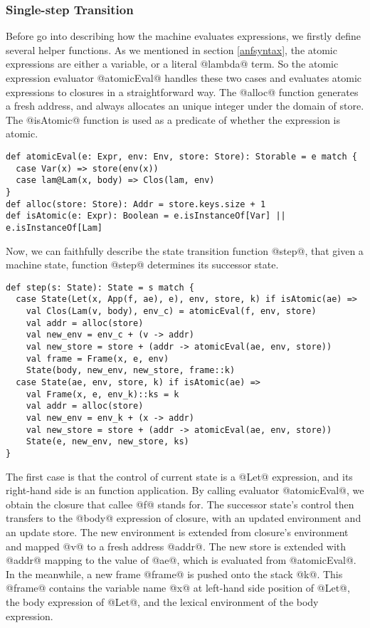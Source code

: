 \documentclass[acmsmall,review,anonymous]{acmart}\settopmatter{printfolios=true,printccs=false,printacmref=false}
\begin{document}
\subsubsection{Single-step Transition}
Before go into describing how the machine evaluates expressions, we firstly define several helper functions.
As we mentioned in section \ref{anfsyntax}, the atomic expressions are either a variable, or
a literal @lambda@ term. So the atomic expression evaluator @atomicEval@ handles these two
cases and evaluates atomic expressions to closures in a straightforward way.
The @alloc@ function generates a fresh address, and always allocates an unique integer under the domain
of store.
The @isAtomic@ function is used as a predicate of whether the expression is atomic.

\begin{lstlisting}
def atomicEval(e: Expr, env: Env, store: Store): Storable = e match {
  case Var(x) => store(env(x))
  case lam@Lam(x, body) => Clos(lam, env)
}
def alloc(store: Store): Addr = store.keys.size + 1
def isAtomic(e: Expr): Boolean = e.isInstanceOf[Var] || e.isInstanceOf[Lam]
\end{lstlisting}

Now, we can faithfully describe the state transition function @step@,
that given a machine state, function @step@ determines its successor state.

\begin{lstlisting}
def step(s: State): State = s match {
  case State(Let(x, App(f, ae), e), env, store, k) if isAtomic(ae) =>
    val Clos(Lam(v, body), env_c) = atomicEval(f, env, store)
    val addr = alloc(store)
    val new_env = env_c + (v -> addr)
    val new_store = store + (addr -> atomicEval(ae, env, store))
    val frame = Frame(x, e, env)
    State(body, new_env, new_store, frame::k)
  case State(ae, env, store, k) if isAtomic(ae) =>
    val Frame(x, e, env_k)::ks = k
    val addr = alloc(store)
    val new_env = env_k + (x -> addr)
    val new_store = store + (addr -> atomicEval(ae, env, store))
    State(e, new_env, new_store, ks)
}
\end{lstlisting}

The first case is that the control of current state is a @Let@ expression,
and its right-hand side is an function application.
By calling evaluator @atomicEval@, we obtain the closure that callee @f@ stands for.
The successor state's control then transfers to the @body@ expression of closure,
with an updated environment and an update store. The new environment is extended
from closure's environment and mapped @v@ to a fresh address @addr@.
The new store is extended with @addr@ mapping to the value of @ae@,
which is evaluated from @atomicEval@.
In the meanwhile, a new frame @frame@ is pushed onto the stack @k@.
This @frame@ contains the variable name @x@ at left-hand side position of @Let@,
the body expression of @Let@, and the lexical environment of the body expression.
\end{document}
